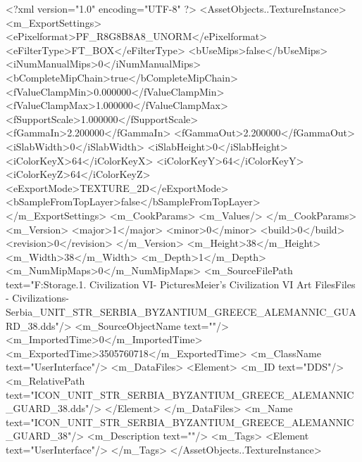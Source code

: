 <?xml version="1.0" encoding="UTF-8" ?>
<AssetObjects..TextureInstance>
	<m_ExportSettings>
		<ePixelformat>PF_R8G8B8A8_UNORM</ePixelformat>
		<eFilterType>FT_BOX</eFilterType>
		<bUseMips>false</bUseMips>
		<iNumManualMips>0</iNumManualMips>
		<bCompleteMipChain>true</bCompleteMipChain>
		<fValueClampMin>0.000000</fValueClampMin>
		<fValueClampMax>1.000000</fValueClampMax>
		<fSupportScale>1.000000</fSupportScale>
		<fGammaIn>2.200000</fGammaIn>
		<fGammaOut>2.200000</fGammaOut>
		<iSlabWidth>0</iSlabWidth>
		<iSlabHeight>0</iSlabHeight>
		<iColorKeyX>64</iColorKeyX>
		<iColorKeyY>64</iColorKeyY>
		<iColorKeyZ>64</iColorKeyZ>
		<eExportMode>TEXTURE_2D</eExportMode>
		<bSampleFromTopLayer>false</bSampleFromTopLayer>
	</m_ExportSettings>
	<m_CookParams>
		<m_Values/>
	</m_CookParams>
	<m_Version>
		<major>1</major>
		<minor>0</minor>
		<build>0</build>
		<revision>0</revision>
	</m_Version>
	<m_Height>38</m_Height>
	<m_Width>38</m_Width>
	<m_Depth>1</m_Depth>
	<m_NumMipMaps>0</m_NumMipMaps>
	<m_SourceFilePath text="F:\Mod Storage\2.1. Civilization VI\Mods\Archive - Pictures\Sid Meier's Civilization VI Art Files\Art Files - Civilizations\Civilization - Serbia\ICON_UNIT_STR_SERBIA_BYZANTIUM_GREECE_ALEMANNIC_GUARD_38.dds"/>
	<m_SourceObjectName text=""/>
	<m_ImportedTime>0</m_ImportedTime>
	<m_ExportedTime>3505760718</m_ExportedTime>
	<m_ClassName text="UserInterface"/>
	<m_DataFiles>
		<Element>
			<m_ID text="DDS"/>
			<m_RelativePath text="ICON_UNIT_STR_SERBIA_BYZANTIUM_GREECE_ALEMANNIC_GUARD_38.dds"/>
		</Element>
	</m_DataFiles>
	<m_Name text="ICON_UNIT_STR_SERBIA_BYZANTIUM_GREECE_ALEMANNIC_GUARD_38"/>
	<m_Description text=""/>
	<m_Tags>
		<Element text="UserInterface"/>
	</m_Tags>
</AssetObjects..TextureInstance>


